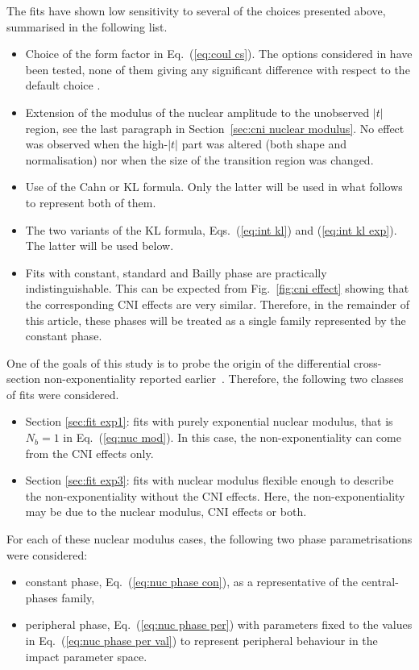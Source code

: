 The fits have shown low sensitivity to several of the choices presented above, summarised in the following list. 
\begin{itemize}
\item Choice of the form factor in Eq.~(\ref{eq:coul cs}). The options considered in \cite{elegent} have been tested, none of them giving any significant difference with respect to the default choice \cite{puckett10}.
\item Extension of the modulus of the nuclear amplitude to the unobserved $|t|$ region, see the last paragraph in Section~\ref{sec:cni nuclear modulus}. No effect was observed when the high-$|t|$ part was altered (both shape and normalisation) nor when the size of the transition region was changed.
\item Use of the Cahn or KL formula. Only the latter will be used in what follows to represent both of them.
\item The two variants of the KL formula, Eqs.~(\ref{eq:int kl}) and (\ref{eq:int kl exp}). The latter will be used below.
\item Fits with constant, standard and Bailly phase are practically indistinguishable. This can be expected from Fig.~\ref{fig:cni effect} showing that the corresponding CNI effects are very similar. Therefore, in the remainder of this article, these phases will be treated as a single family represented by the constant phase.
\end{itemize}


One of the goals of this study is to probe the origin of the differential cross-section non-exponentiality reported earlier~\cite{8tev-90m}. Therefore, the following two classes of fits were considered.
\begin{itemize}
\item Section \ref{sec:fit exp1}: fits with purely exponential nuclear modulus, that is $N_b=1$ in Eq.~(\ref{eq:nuc mod}). In this case, the non-exponentiality can come from the CNI effects only.
\item Section \ref{sec:fit exp3}: fits with nuclear modulus flexible enough to describe the non-exponentiality without the CNI effects. Here, the non-exponentiality may be due to the nuclear modulus, CNI effects or both.
\end{itemize}
For each of these nuclear modulus cases, the following two phase parametrisations were considered:
\begin{itemize}\setlength\itemsep{0pt}
\item constant phase, Eq.~(\ref{eq:nuc phase con}), as a representative of the central-phases family,
\item peripheral phase, Eq.~(\ref{eq:nuc phase per}) with parameters fixed to the values in Eq.~(\ref{eq:nuc phase per val}) to represent peripheral behaviour in the impact parameter space.
\end{itemize}

